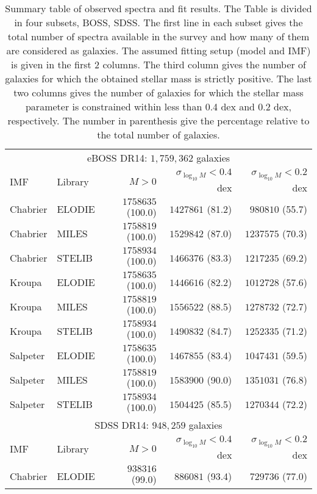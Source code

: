 \documentclass[onecolumn]{aa}
\begin{document}
\begin{table*}
\caption{\label{table:single:spectra} Summary table of observed spectra and fit results. 
The Table is divided in four subsets, BOSS, SDSS.
The first line in each subset gives the total number of spectra available in the survey and how many of them are considered as galaxies. 
The assumed fitting setup (model and IMF) is given in the first 2 columns. 
The third column gives the number of galaxies for which the obtained stellar mass is strictly positive. 
The last two columns gives the number of galaxies for which the stellar mass parameter is constrained within less than 0.4 dex and 0.2 dex, respectively. 
The number in parenthesis give the percentage relative to the total number of galaxies.}
\begin{center}
\begin{tabular}{ll rrr}
\hline \hline
\multicolumn{5}{c}{eBOSS DR14: $1,759,362$ galaxies} \\
IMF &
Library & 
$M>0$ & 
$\sigma_{\log_{10}M}<0.4$ dex & 
$\sigma_{\log_{10}M}<0.2$ dex \\ \hline
Chabrier & ELODIE & $1758635$ (100.0) & $1427861$ (81.2) & $980810$ (55.7) \\ 
Chabrier & MILES & $1758819$ (100.0) & $1529842$ (87.0) & $1237575$ (70.3) \\ 
Chabrier & STELIB & $1758934$ (100.0) & $1466376$ (83.3) & $1217235$ (69.2) \\ 
Kroupa & ELODIE & $1758635$ (100.0) & $1446616$ (82.2) & $1012728$ (57.6) \\ 
Kroupa & MILES & $1758819$ (100.0) & $1556522$ (88.5) & $1278732$ (72.7) \\ 
Kroupa & STELIB & $1758934$ (100.0) & $1490832$ (84.7) & $1252335$ (71.2) \\ 
Salpeter & ELODIE & $1758635$ (100.0) & $1467855$ (83.4) & $1047431$ (59.5) \\ 
Salpeter & MILES & $1758819$ (100.0) & $1583900$ (90.0) & $1351031$ (76.8) \\ 
Salpeter & STELIB & $1758934$ (100.0) & $1504425$ (85.5) & $1270344$ (72.2) \\ 
\hline 
 \multicolumn{5}{c}{SDSS DR14: $948,259$ galaxies} \\
IMF &
Library & 
$M>0$ & 
$\sigma_{\log_{10}M}<0.4$ dex & 
$\sigma_{\log_{10}M}<0.2$ dex \\ \hline
Chabrier & ELODIE & $938316$ (99.0) & $886081$ (93.4) & $729736$ (77.0) \\ 

\end{tabular}
\end{center}
\end{table*}
\end{document}

